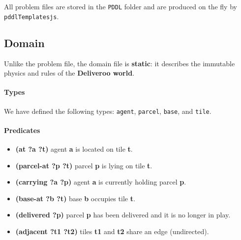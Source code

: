 All problem files are stored in the \texttt{PDDL} folder and are produced on the fly by \texttt{pddlTemplates\.js}.

\subsection{Domain}

Unlike the problem file, the domain file is \textbf{static}: it describes the immutable physics and rules of the \textbf{Deliveroo world}.

\paragraph{Types}
We have defined the following types:  \texttt{agent}, \texttt{parcel}, \texttt{base}, and \texttt{tile}.

\paragraph{Predicates}
\begin{itemize}
  \item\textbf{(at ?a ?t)} agent \textbf{a} is located on tile \textbf{t}.
  \item\textbf{(parcel-at ?p ?t)} parcel \textbf{p} is lying on tile \textbf{t}.
  \item\textbf{(carrying ?a ?p)} agent \textbf{a} is currently holding parcel \textbf{p}.
  \item\textbf{(base-at ?b ?t)} base \textbf{b} occupies tile \textbf{t}.
  \item\textbf{(delivered ?p)} parcel \textbf{p} has been delivered and it is no longer in play.
  \item\textbf{(adjacent ?t1 ?t2)} tiles \textbf{t1} and \textbf{t2} share an edge (undirected).
\end{itemize}


